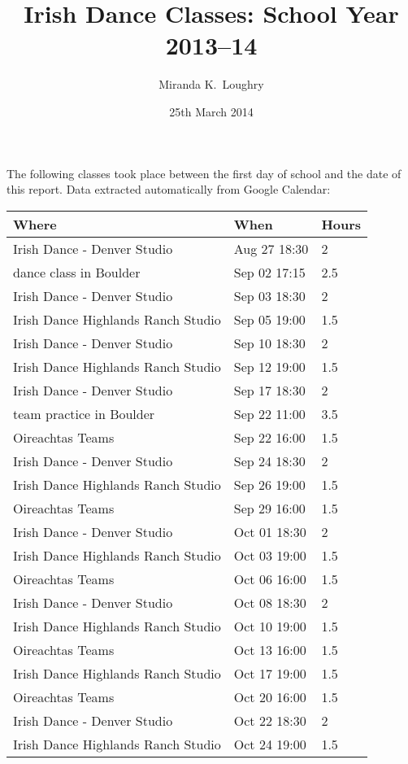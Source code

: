 \documentclass[a4paper]{article}
\begin{document}
\title{Irish Dance Classes: School Year 2013--14}
\author{Miranda K.~Loughry}
\date{25th March 2014}
\maketitle

The following classes took place between the first day of school and the
date of this report. Data extracted automatically from Google Calendar:

\begin{longtable}{lll}
\textbf{Where} & \textbf{When} & \textbf{Hours} \\
\hline
\endhead
Irish Dance - Denver Studio & Aug 27 18:30 & 2 \\
dance class in Boulder & Sep 02 17:15 & 2.5 \\
Irish Dance - Denver Studio & Sep 03 18:30 & 2 \\
Irish Dance Highlands Ranch Studio & Sep 05 19:00 & 1.5 \\
Irish Dance - Denver Studio & Sep 10 18:30 & 2 \\
Irish Dance Highlands Ranch Studio & Sep 12 19:00 & 1.5 \\
Irish Dance - Denver Studio & Sep 17 18:30 & 2 \\
team practice in Boulder & Sep 22 11:00 & 3.5 \\
Oireachtas Teams & Sep 22 16:00 & 1.5 \\
Irish Dance - Denver Studio & Sep 24 18:30 & 2 \\
Irish Dance Highlands Ranch Studio & Sep 26 19:00 & 1.5 \\
Oireachtas Teams & Sep 29 16:00 & 1.5 \\
Irish Dance - Denver Studio & Oct 01 18:30 & 2 \\
Irish Dance Highlands Ranch Studio & Oct 03 19:00 & 1.5 \\
Oireachtas Teams & Oct 06 16:00 & 1.5 \\
Irish Dance - Denver Studio & Oct 08 18:30 & 2 \\
Irish Dance Highlands Ranch Studio & Oct 10 19:00 & 1.5 \\
Oireachtas Teams & Oct 13 16:00 & 1.5 \\
Irish Dance Highlands Ranch Studio & Oct 17 19:00 & 1.5 \\
Oireachtas Teams & Oct 20 16:00 & 1.5 \\
Irish Dance - Denver Studio & Oct 22 18:30 & 2 \\
Irish Dance Highlands Ranch Studio & Oct 24 19:00 & 1.5 \\

\end{longtable}
\end{document}
